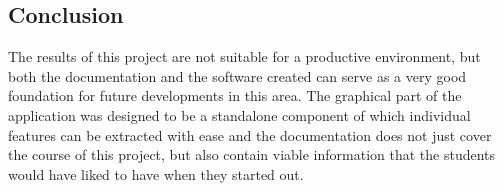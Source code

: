  
\subsection{Conclusion}
The results of this project are not suitable for a productive environment, but both the documentation and the software created can serve as a very good foundation for future developments in this area. The graphical part of the application was designed to be a standalone component of which individual features can be extracted with ease and the documentation does not just cover the course of this project, but also contain viable information that the students would have liked to have when they started out.
